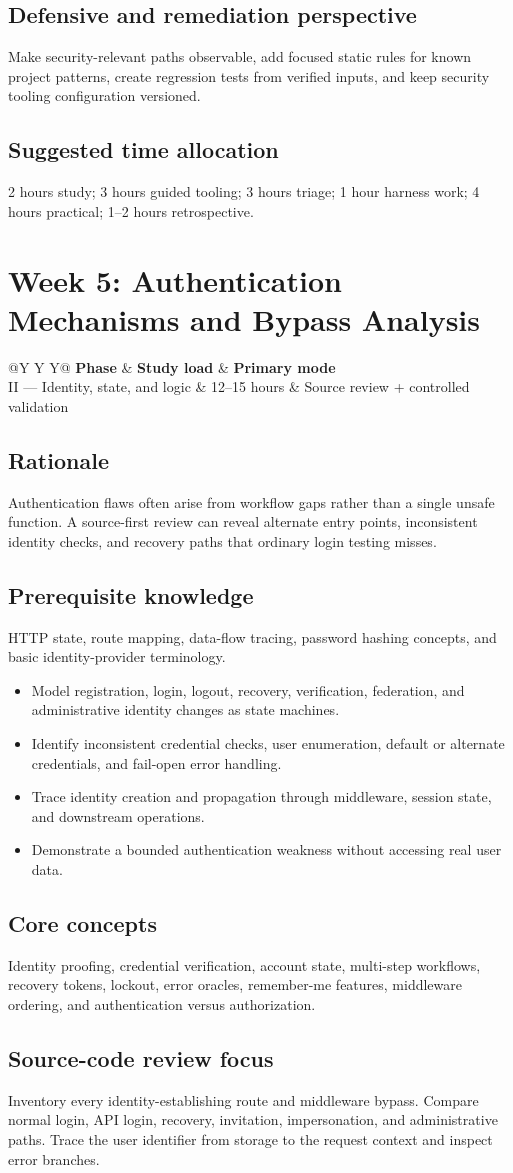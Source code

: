 \documentclass[11pt]{article}
\makeatletter
\newcommand{\weekheader}[4]{%
  \clearpage
  \section{Week #1: #2}
  \begin{tcolorbox}[colback=Navy,colframe=Navy,coltext=white]
    \begin{tabularx}{\linewidth}{@{}Y Y Y@{}}
      \textbf{Phase} & \textbf{Study load} & \textbf{Primary mode}\\
      #3 & #4 hours & Source review + controlled validation
    \end{tabularx}
  \end{tcolorbox}
}
\newcommand{\weekfield}[2]{%
  \Needspace{5\baselineskip}
  \subsection*{#1}
  #2
}
\makeatother
\begin{document}
\weekfield{Defensive and remediation perspective}{Make security-relevant paths
observable, add focused static rules for known project patterns, create regression
tests from verified inputs, and keep security tooling configuration versioned.}

\weekfield{Suggested time allocation}{2 hours study; 3 hours guided tooling; 3
hours triage; 1 hour harness work; 4 hours practical; 1--2 hours retrospective.}

\weekheader{5}{Authentication Mechanisms and Bypass Analysis}{II --- Identity, state, and logic}{12--15}

\weekfield{Rationale}{Authentication flaws often arise from workflow gaps rather
than a single unsafe function. A source-first review can reveal alternate entry
points, inconsistent identity checks, and recovery paths that ordinary login
testing misses.}

\weekfield{Prerequisite knowledge}{HTTP state, route mapping, data-flow tracing,
password hashing concepts, and basic identity-provider terminology.}

\begin{objectivebox}
\begin{itemize}
  \item Model registration, login, logout, recovery, verification, federation, and administrative identity changes as state machines.
  \item Identify inconsistent credential checks, user enumeration, default or alternate credentials, and fail-open error handling.
  \item Trace identity creation and propagation through middleware, session state, and downstream operations.
  \item Demonstrate a bounded authentication weakness without accessing real user data.
\end{itemize}
\end{objectivebox}

\weekfield{Core concepts}{Identity proofing, credential verification, account
state, multi-step workflows, recovery tokens, lockout, error oracles, remember-me
features, middleware ordering, and authentication versus authorization.}

\weekfield{Source-code review focus}{Inventory every identity-establishing route
and middleware bypass. Compare normal login, API login, recovery, invitation,
impersonation, and administrative paths. Trace the user identifier from storage to
the request context and inspect error branches.}
\end{document}

